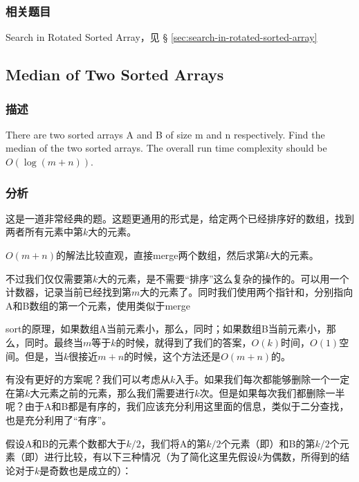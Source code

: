 \subsubsection{相关题目}

\begindot
\item Search in Rotated Sorted Array，见 \S 
\ref{sec:search-in-rotated-sorted-array}
\myenddot


\subsection{Median of Two Sorted Arrays}
\label{sec:median-of-two-sorted-arrays}


\subsubsection{描述}
There are two sorted arrays A and B of size m and n respectively. Find the 
median of the two sorted arrays. The overall run time complexity should be 
$O(\log (m+n))$.


\subsubsection{分析}
这是一道非常经典的题。这题更通用的形式是，给定两个已经排序好的数组，找到两者所有元素中第$k$大的元素。

$O(m+n)$的解法比较直观，直接merge两个数组，然后求第$k$大的元素。

不过我们仅仅需要第$k$大的元素，是不需要“排序”这么复杂的操作的。可以用一个计数器，记录当前已经找到第$m$大的元素了。同时我们使用两个指针和，分别指向A和B数组的第一个元素，使用类似于merge
 
sort的原理，如果数组A当前元素小，那么，同时；如果数组B当前元素小，那么，同时。最终当$m$等于$k$的时候，就得到了我们的答案，$O(k)$时间，$O(1)$空间。但是，当$k$很接近$m+n$的时候，这个方法还是$O(m+n)$的。

有没有更好的方案呢？我们可以考虑从$k$入手。如果我们每次都能够删除一个一定在第$k$大元素之前的元素，那么我们需要进行$k$次。但是如果每次我们都删除一半呢？由于A和B都是有序的，我们应该充分利用这里面的信息，类似于二分查找，也是充分利用了“有序”。

假设A和B的元素个数都大于$k/2$，我们将A的第$k/2$个元素（即）和B的第$k/2$个元素（即）进行比较，有以下三种情况（为了简化这里先假设$k$为偶数，所得到的结论对于$k$是奇数也是成立的）：
\begindot
\item {}
\item {}
\item {}
\myenddot

